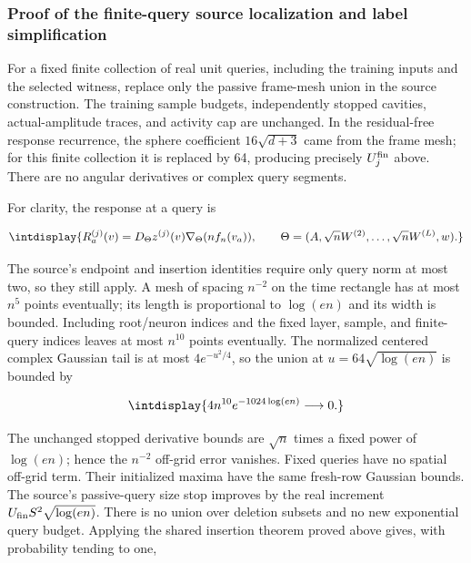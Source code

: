 \subsubsection{Proof of the finite-query source localization and label simplification}



For a fixed finite collection of real unit queries, including the training inputs and the selected witness, replace only the passive frame-mesh union in the source construction. The training sample budgets, independently stopped cavities, actual-amplitude traces, and activity cap are unchanged. In the residual-free response recurrence, the sphere coefficient \(16\sqrt{d+3}\) came from the frame mesh; for this finite collection it is replaced by 64, producing precisely \(U_j^{\rm fin}\) above. There are no angular derivatives or complex query segments.



For clarity, the response at a query is


\begingroup\renewcommand{\theHequation}{intdisplay.494}
\begin{equation*}
\intdisplay{
R_a^{(j)}(v)=D_\Theta z^{(j)}(v)\nabla_\Theta(nf_n(v_a)),
\qquad
\Theta=(A,\sqrt nW^{(2)},\ldots,\sqrt nW^{(L)},w).
}
\end{equation*}
\endgroup


The source's endpoint and insertion identities require only query norm at most two, so they still apply. A mesh of spacing \(n^{-2}\) on the time rectangle has at most \(n^5\) points eventually; its length is proportional to \(\log(en)\) and its width is bounded. Including root/neuron indices and the fixed layer, sample, and finite-query indices leaves at most \(n^{10}\) points eventually. The normalized centered complex Gaussian tail is at most \(4e^{-u^2/4}\), so the union at \(u=64\sqrt{\log(en)}\) is bounded by


\begingroup\renewcommand{\theHequation}{intdisplay.495}
\begin{equation*}
\intdisplay{
4n^{10}e^{-1024\log(en)}\longrightarrow0.
}
\end{equation*}
\endgroup


The unchanged stopped derivative bounds are \(\sqrt n\) times a fixed power of \(\log(en)\); hence the \(n^{-2}\) off-grid error vanishes. Fixed queries have no spatial off-grid term. Their initialized maxima have the same fresh-row Gaussian bounds. The source's passive-query size stop improves by the real increment \(U_{\rm fin}S^2\sqrt{\log(en)}\). There is no union over deletion subsets and no new exponential query budget. Applying the shared insertion theorem proved above gives, with probability tending to one,


